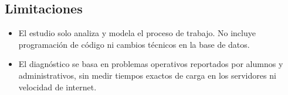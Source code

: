 \subsection{Limitaciones}
\begin{itemize}
\item El estudio solo analiza y modela el proceso de trabajo. No incluye programación de código ni cambios técnicos en la base de datos.
\item El diagnóstico se basa en problemas operativos reportados por alumnos y administrativos, sin medir tiempos exactos de carga en los servidores ni velocidad de internet.
\end{itemize}